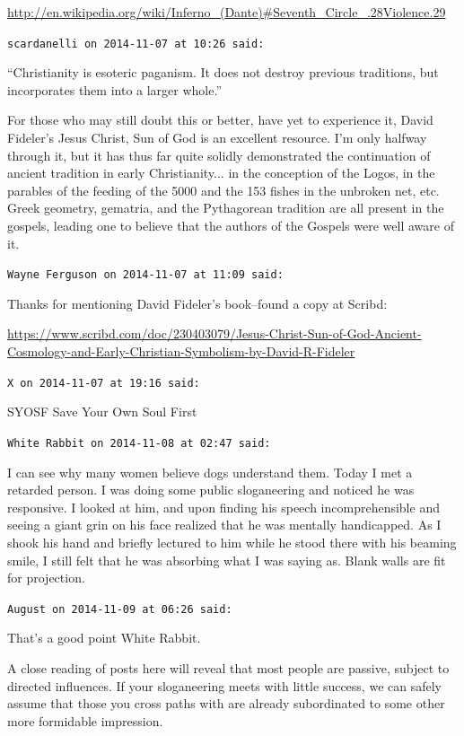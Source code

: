 \begin{footnotesize}
\begin{sffamily}
\url{http://en.wikipedia.org/wiki/Inferno\_(Dante)\#Seventh\_Circle\_.28Violence.29}


\hfill

\texttt{scardanelli on 2014-11-07 at 10:26 said:}

``Christianity is esoteric paganism. It does not destroy previous traditions, but incorporates them into a larger whole.''

For those who may still doubt this or better, have yet to experience it, David Fideler's Jesus Christ, Sun of God is an excellent resource. I'm only halfway through it, but it has thus far quite solidly demonstrated the continuation of ancient tradition in early Christianity... in the conception of the Logos, in the parables of the feeding of the 5000 and the 153 fishes in the unbroken net, etc. Greek geometry, gematria, and the Pythagorean tradition are all present in the gospels, leading one to believe that the authors of the Gospels were well aware of it.

\hfill

\texttt{Wayne Ferguson on 2014-11-07 at 11:09 said:}

Thanks for mentioning David Fideler's book--found a copy at Scribd:

\url{https://www.scribd.com/doc/230403079/Jesus-Christ-Sun-of-God-Ancient-Cosmology-and-Early-Christian-Symbolism-by-David-R-Fideler}


\hfill

\texttt{X on 2014-11-07 at 19:16 said:}

SYOSF Save Your Own Soul First

\hfill

\texttt{White Rabbit on 2014-11-08 at 02:47 said:}

I can see why many women believe dogs understand them. Today I met a retarded person. I was doing some public sloganeering and noticed he was responsive. I looked at him, and upon finding his speech incomprehensible and seeing a giant grin on his face realized that he was mentally handicapped. As I shook his hand and briefly lectured to him while he stood there with his beaming smile, I still felt that he was absorbing what I was saying as. Blank walls are fit for projection.

\hfill

\texttt{August on 2014-11-09 at 06:26 said:}

That's a good point White Rabbit.

A close reading of posts here will reveal that most people are passive, subject to directed influences. If your sloganeering meets with little success, we can safely assume that those you cross paths with are already subordinated to some other more formidable impression.


\end{sffamily}
\end{footnotesize}
